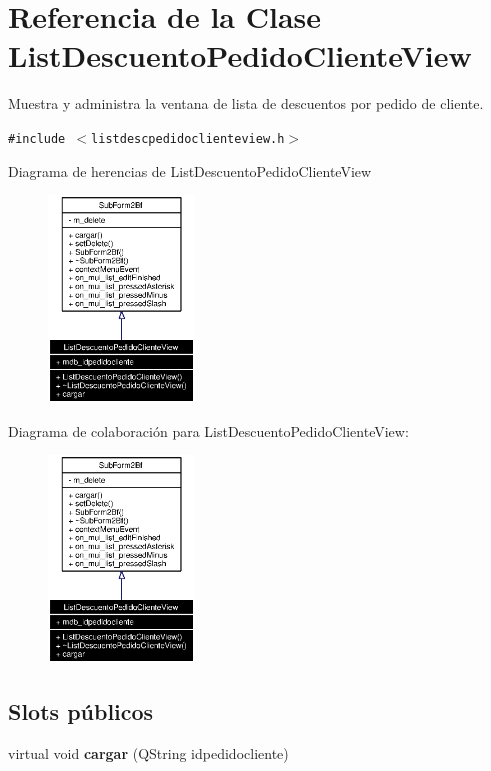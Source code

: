 \section{Referencia de la Clase List\-Descuento\-Pedido\-Cliente\-View}
\label{classListDescuentoPedidoClienteView}
Muestra y administra la ventana de lista de descuentos por pedido de cliente.  


{\tt \#include $<$listdescpedidoclienteview.h$>$}

Diagrama de herencias de List\-Descuento\-Pedido\-Cliente\-View\begin{figure}[H]
\begin{center}
\leavevmode
\includegraphics[width=110pt]{classListDescuentoPedidoClienteView__inherit__graph}
\end{center}
\end{figure}
Diagrama de colaboraci\'{o}n para List\-Descuento\-Pedido\-Cliente\-View:\begin{figure}[H]
\begin{center}
\leavevmode
\includegraphics[width=110pt]{classListDescuentoPedidoClienteView__coll__graph}
\end{center}
\end{figure}
\subsection*{Slots p\'{u}blicos}
\begin{CompactItemize}
\item 
virtual void {\bf cargar} (QString idpedidocliente)\label{classListDescuentoPedidoClienteView_i0}

\end{CompactItemize}
